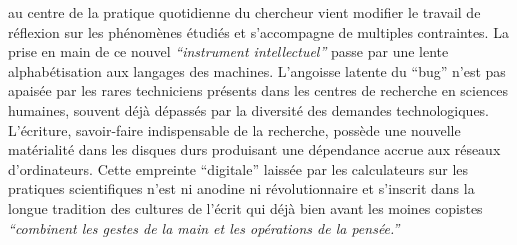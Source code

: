 au centre de la pratique quotidienne du chercheur vient modifier le
travail de r\'eflexion sur les ph\'enom\`enes \'etudi\'es et
s{\textquoteright}accompagne de multiples contraintes. La prise en main
de ce nouvel \textit{{\textquotedblleft}instrument
intellectuel{\textquotedblright} }\citep{Guichard2014} passe par une lente
alphab\'etisation aux langages des machines. L{\textquoteright}angoisse
latente du {\textquotedblleft}bug{\textquotedblright}
n{\textquoteright}est pas apais\'ee par les rares techniciens
pr\'esents dans les centres de recherche en sciences humaines, souvent
d\'ej\`a d\'epass\'es par la diversit\'e des demandes technologiques.
L{\textquoteright}\'ecriture, savoir-faire indispensable de la
recherche, poss\`ede une nouvelle mat\'erialit\'e dans les disques durs
produisant une d\'ependance accrue aux r\'eseaux
d{\textquoteright}ordinateurs. Cette empreinte
{\textquotedblleft}digitale{\textquotedblright} laiss\'ee par les
calculateurs sur les pratiques scientifiques n{\textquoteright}est ni
anodine ni r\'evolutionnaire et s{\textquoteright}inscrit dans la
longue tradition des cultures de l{\textquoteright}\'ecrit qui d\'ej\`a
bien avant les moines copistes \textit{{\textquotedblleft}combinent les
gestes de la main et les op\'erations de la
pens\'ee.{\textquotedblright}} \citep{Jacob2011} 

